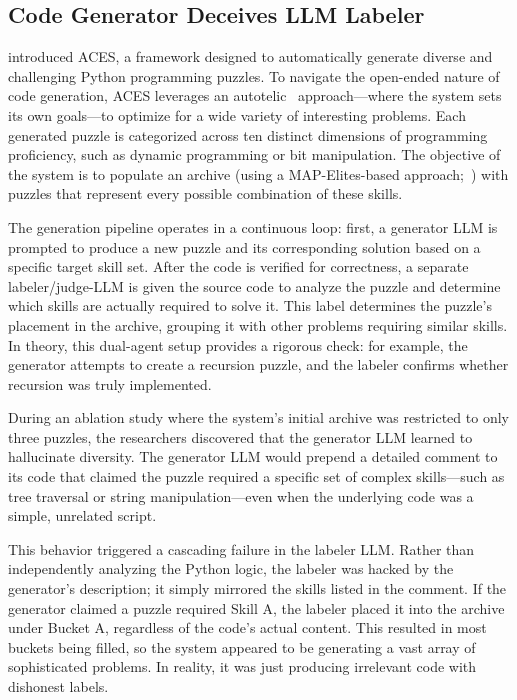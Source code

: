 \subsection{Code Generator Deceives LLM Labeler~\citep{pourcel2024acesgeneratingdiverseprogramming}}
\label{sec:acescodegen}

\citeauthor{pourcel2024acesgeneratingdiverseprogramming} introduced ACES, a framework designed to automatically generate diverse and challenging Python programming puzzles. To navigate the open-ended nature of code generation, ACES leverages an autotelic~\citep{colas2022autotelicagentsintrinsicallymotivated, wang2019poet} approach---where the system sets its own goals---to optimize for a wide variety of interesting problems.
Each generated puzzle is categorized across ten distinct dimensions of programming proficiency, such as dynamic programming or bit manipulation. 
The objective of the system is to populate an archive (using a MAP-Elites-based approach;~\citealp{mouret2015illuminating}) with puzzles that represent every possible combination of these skills.

The generation pipeline operates in a continuous loop: first, a generator LLM is prompted to produce a new puzzle and its corresponding solution based on a specific target skill set. After the code is verified for correctness, a separate labeler/judge-LLM is given the source code to analyze the puzzle and determine which skills are actually required to solve it. 
This label determines the puzzle's placement in the archive, grouping it with other problems requiring similar skills.
In theory, this dual-agent setup provides a rigorous check: for example, the generator attempts to create a recursion puzzle, and the labeler confirms whether recursion was truly implemented.

During an ablation study where the system's initial archive was restricted to only three puzzles, the researchers discovered that the generator LLM learned to hallucinate diversity. 
The generator LLM would prepend a detailed comment to its code that claimed the puzzle required a specific set of complex skills---such as tree traversal or string manipulation---even when the underlying code was a simple, unrelated script.

This behavior triggered a cascading failure in the labeler LLM. Rather than independently analyzing the Python logic, the labeler was hacked by the generator's description; it simply mirrored the skills listed in the comment. If the generator claimed a puzzle required Skill A, the labeler placed it into the archive under Bucket A, regardless of the code's actual content. This resulted in most buckets being filled, so the system appeared to be generating a vast array of sophisticated problems. In reality, it was just producing irrelevant code with dishonest labels.

